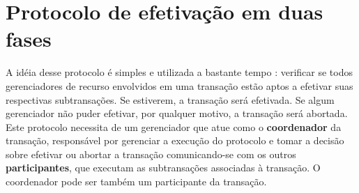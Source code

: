 \documentclass[11pt,twoside,a4paper]{book}
\begin{document}



\section{Protocolo de efetivação em duas fases}
\label{sec:2pc}
A idéia desse protocolo é simples e utilizada a bastante tempo \cite{2pc}: verificar se todos gerenciadores de recurso envolvidos em uma transação estão aptos a efetivar suas respectivas subtransações. Se estiverem, a transação será efetivada. Se algum gerenciador não puder efetivar, por qualquer motivo, a transação será abortada. Este protocolo necessita de um gerenciador que atue como o \textbf{coordenador} da transação, responsável por gerenciar a execução do protocolo e tomar a decisão sobre efetivar ou abortar a transação comunicando-se com os outros \textbf{participantes}, que executam as subtransações associadas à transação. O coordenador pode ser também um participante da transação.
\end{document}
